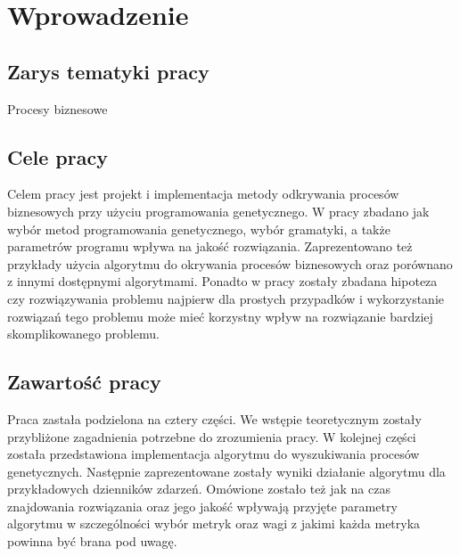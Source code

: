\chapter{Wprowadzenie}
\label{cha:wprowadzenie}


\section{Zarys tematyki pracy}
\label{sec:zarysPracy}
Procesy biznesowe 


\section{Cele pracy}
\label{sec:celePracy}

Celem pracy jest projekt i implementacja metody odkrywania procesów biznesowych przy użyciu programowania genetycznego. W pracy zbadano jak wybór metod programowania genetycznego, wybór gramatyki, a także parametrów programu wpływa na jakość rozwiązania. Zaprezentowano też przykłady użycia algorytmu do okrywania procesów biznesowych oraz porównano z innymi dostępnymi algorytmami. Ponadto w pracy zostały zbadana hipoteza czy rozwiązywania problemu najpierw dla prostych przypadków i wykorzystanie rozwiązań tego problemu może mieć korzystny wpływ na rozwiązanie bardziej skomplikowanego problemu.

\section{Zawartość pracy}
\label{sec:zawartoscPracy}

Praca zastała podzielona na cztery części. We wstępie teoretycznym zostały przybliżone zagadnienia potrzebne do zrozumienia pracy. W kolejnej części została przedstawiona implementacja algorytmu do wyszukiwania procesów genetycznych. Następnie zaprezentowane zostały wyniki działanie algorytmu dla przykładowych dzienników zdarzeń. Omówione zostało też jak na czas znajdowania rozwiązania oraz jego jakość wpływają przyjęte parametry algorytmu w szczególności wybór metryk oraz wagi z jakimi każda metryka powinna być brana pod uwagę.  


















